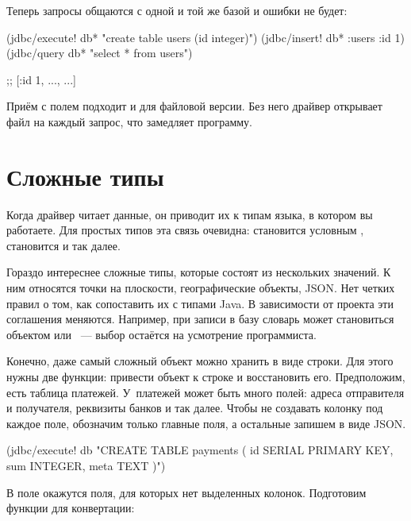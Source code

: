 Теперь запросы общаются с одной и той же базой и ошибки не будет:

\begin{english}
  \begin{clojure}
(jdbc/execute! db* "create table users (id integer)")
(jdbc/insert! db* :users {:id 1})
(jdbc/query db* "select * from users")

;; [{:id 1, ...}, ...]
  \end{clojure}
\end{english}

Приём с полем  подходит и для файловой версии. Без него драйвер открывает файл на каждый запрос, что замедляет программу.

\section{Сложные типы}


Когда драйвер читает данные, он приводит их к типам языка, в котором вы работаете. Для простых типов эта связь очевидна:  становится условным ,  становится  и так далее.


Гораздо интереснее сложные типы, которые состоят из нескольких значений. К ним относятся точки на плоскости, географические объекты, JSON. Нет четких правил о том, как сопоставить их с типами Java. В зависимости от проекта эти соглашения меняются. Например, при записи в базу словарь может становиться объектом  или ~--- выбор остаётся на усмотрение программиста.

Конечно, даже самый сложный объект можно хранить в виде строки. Для этого нужны две функции: привести объект к строке и восстановить его. Предположим, есть таблица платежей. У~платежей может быть много полей: адреса отправителя и получателя, реквизиты банков и так далее. Чтобы не создавать колонку под каждое поле, обозначим только главные поля, а остальные запишем в виде JSON.

\begin{english}
  \begin{clojure}
(jdbc/execute! db "CREATE TABLE payments (
  id SERIAL PRIMARY KEY,
  sum INTEGER,
  meta TEXT
)")
  \end{clojure}
\end{english}

В поле  окажутся поля, для которых нет выделенных колонок. Подготовим функции для конвертации:

